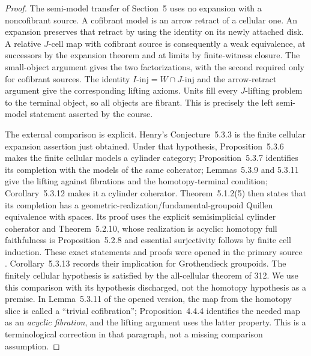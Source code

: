 \begin{proof}
The semi-model transfer of Section~5 uses no expansion with a
noncofibrant source. A cofibrant model is an arrow retract of a
cellular one. An expansion preserves that retract by using the
identity on its newly attached disk. A relative $J$-cell map with
cofibrant source is consequently a weak equivalence, at successors
by the expansion theorem and at limits by finite-witness closure.
The small-object argument gives the two factorizations, with the
second required only for cofibrant sources. The identity
$I\text{-}\mathrm{inj}=W\cap J\text{-}\mathrm{inj}$ and the
arrow-retract argument give the corresponding lifting axioms.
Units fill every $J$-lifting problem to the terminal object, so
all objects are fibrant. This is precisely the left semi-model
statement asserted by the course.

The external comparison is explicit. Henry's Conjecture~5.3.3 is
the finite cellular expansion assertion just obtained. Under that
hypothesis, Proposition~5.3.6 makes the finite cellular models a
cylinder category; Proposition~5.3.7 identifies its completion with
the models of the same coherator; Lemmas~5.3.9 and 5.3.11 give
the lifting against fibrations and the homotopy-terminal
condition; Corollary~5.3.12 makes it a cylinder coherator.
Theorem~5.1.2(5) then states that its completion has a
geometric-realization/fundamental-groupoid Quillen equivalence
with spaces. Its proof uses the explicit semisimplicial cylinder
coherator and Theorem~5.2.10, whose realization is acyclic:
homotopy full faithfulness is Proposition~5.2.8 and essential
surjectivity follows by finite cell induction. These exact
statements and proofs were opened in the primary source
\cite{I_Henry2016}. Corollary~5.3.13 records their implication for
Grothendieck groupoids. The finitely cellular hypothesis is
satisfied by the all-cellular theorem of 312. We use this
comparison with its hypothesis discharged, not the homotopy
hypothesis as a premise. In Lemma~5.3.11 of the opened version,
the map from the homotopy slice is called a ``trivial cofibration'';
Proposition~4.4.4 identifies the needed map as an \emph{acyclic
fibration}, and the lifting argument uses the latter property.
This is a terminological correction in that paragraph, not a
missing comparison assumption.
\end{proof}

